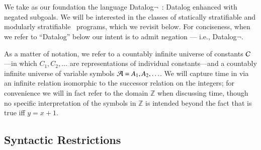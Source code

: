 \section{\large \bf \slang}
We take as our foundation the language Datalog$\lnot$~\cite{ullmanbook}: Datalog enhanced with negated subgoals.  We will be interested in the
classes of statically stratifiable 
and modularly stratifiable~\cite{modular} programs, which we revisit below.  For conciseness, when we refer to ``Datalog'' below our intent is to admit negation --- i.e., Datalog$\lnot$.  


As a matter of notation, we refer to a countably infinite universe of constants
$\Consts$---in which $C_{1}, C_{2}, \ldots$ are representations of individual
constants---and a countably infinite universe of variable symbols $\Vars = A_1,
A_2, \ldots$.
We will capture time in \slang via an infinite relation  isomorphic to the successor relation on the integers; for convenience we will in fact refer to the domain $\mathbb{Z}$ when discussing time, though no specific interpretation of the symbols in $\mathbb{Z}$ is intended beyond the fact that  is true iff $y = x + 1$.


\subsection{Syntactic Restrictions}
\label{sec:syntaxrestrictions}

